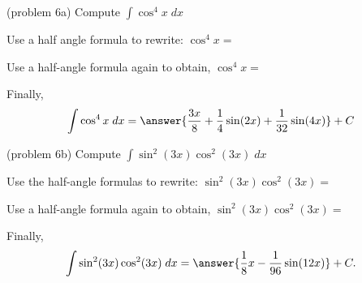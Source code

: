 \documentclass[handout]{ximera}
\begin{document}
\begin{problem}(problem 6a)
Compute $\displaystyle{\int \cos^4 x \; dx}$


Use a half angle formula to rewrite: $\cos^4 x=$

\begin{multipleChoice}
\end{multipleChoice}

Use a half-angle formula again to obtain, $\cos^4 x = $

\begin{multipleChoice}
\end{multipleChoice}

Finally,
\[
\int \cos^4 x \; dx = \answer{\frac{3x}{8} +\frac14 \sin(2x) + \frac{1}{32}\sin(4x)} + C
\]
\end{problem}



\begin{problem}(problem 6b)
Compute $\displaystyle{\int \sin^2(3x)\cos^2(3x) \; dx}$


Use the half-angle formulas to rewrite: $\sin^2(3x) \cos^2(3x)=$

\begin{multipleChoice}
\end{multipleChoice}

Use a half-angle formula again to obtain, $\sin^2(3x) \cos^2(3x)=$

\begin{multipleChoice}
\end{multipleChoice}

Finally,
\[
\int \sin^2(3x)\cos^2(3x) \; dx = \answer{\frac18 x - \frac{1}{96} \sin(12x)} + C.
\]

\end{problem}


\end{document}
